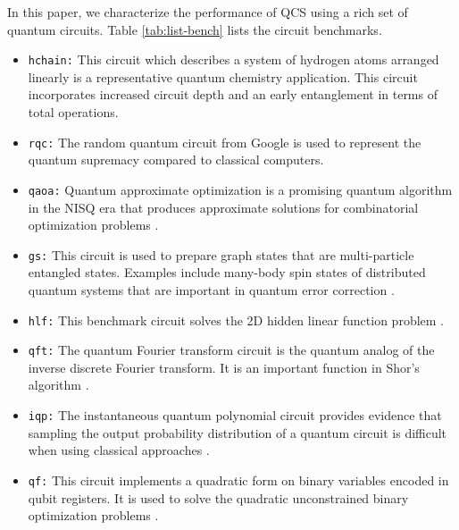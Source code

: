 In this paper, we characterize the performance of QCS using a rich set of quantum circuits. Table \ref{tab:list-bench} lists the circuit benchmarks. 
\begin{itemize}
\item {\tt hchain:}
This circuit which describes a system of hydrogen atoms arranged linearly is a representative quantum chemistry application\cite{10.1103/PhysRevX.10.031058,10.1063/1.2770707,10.1063/1.2345196,10.1063/1.5129672,10.1103/PhysRevA.95.020501}. This circuit incorporates increased circuit depth and an early entanglement in terms of total operations.
\item {\tt rqc:}
The random quantum circuit from Google \cite{10.1038/s41567-018-0124-x,10.1038/s41567-018-0318-2} is used to represent the quantum supremacy compared to classical computers. 
\item {\tt qaoa:} 
Quantum approximate optimization is a promising quantum algorithm in the NISQ era that produces approximate solutions for combinatorial optimization problems \cite{10.48550/arXiv.1411.4028}. 
\item {\tt gs:}
This circuit is used to prepare graph states \cite{10.1103/PhysRevA.71.012319} that are multi-particle entangled states. Examples include many-body spin states of distributed quantum systems that are important in quantum error correction \cite{10.1017/CBO9781139034807}. 
\item {\tt hlf:}
This benchmark circuit solves the 2D hidden linear function problem \cite{10.1126/science.aar3106}. 
\item {\tt qft:}
The quantum Fourier transform circuit \cite{10.1016/j.parco.2014.12.001} is the quantum analog of the inverse discrete Fourier transform. It is an important function in Shor's algorithm \cite{10.1137/S0036144598347011}.
\item {\tt iqp:} 
The instantaneous quantum polynomial circuit provides evidence that sampling the output probability distribution of a quantum circuit is difficult when using classical approaches \cite{10.1098/rspa.2010.0301,10.1103/PhysRevLett.117.080501}.
\item {\tt qf:}
This circuit implements a quadratic form on binary variables encoded in qubit registers. It is used to solve the quadratic unconstrained binary optimization problems \cite{10.22331/q-2021-04-08-428}.
\end{itemize}

